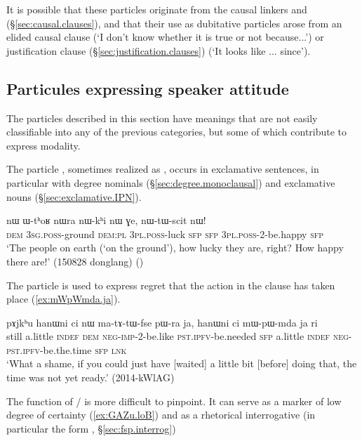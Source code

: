 It is possible that these particles originate from the causal linkers  and  (§\ref{sec:causal.clauses}), and that their use as dubitative particles arose from an elided causal clause (`I don't know whether it is true or not because...') or justification clause (§\ref{sec:justification.clauses}) (`It looks like ... since').

\subsection{Particules expressing speaker attitude} \label{sec:fsp.attitude}
The particles described in this section have meanings that are not easily classifiable into any of the previous categories, but some of which contribute to express modality.
 
The particle , sometimes realized as , occurs in exclamative sentences, in particular with degree nominals (§\ref{sec:degree.monoclausal}) and exclamative nouns (§\ref{sec:exclamative.IPN}).

\begin{exe} 
\ex \label{ex:nWtWscit.nW}
\gll  nɯ ɯ-tʰoʁ nɯra nɯ-kʰi nɯ ɣe, nɯ-tɯ-scit nɯ! \\
\textsc{dem} \textsc{3sg}.\textsc{poss}-ground \textsc{dem}:\textsc{pl} \textsc{3pl}.\textsc{poss}-luck \textsc{sfp} \textsc{sfp}  \textsc{3pl}.\textsc{poss}-2-be.happy \textsc{sfp} \\
\glt `The people on earth (`on the ground'), how lucky they are, right? How happy there are!' (150828 donglang) ()
\end{exe} 

The particle  is used to express regret that the action in the clause has taken place (\ref{ex:mWpWmda.ja}).

\begin{exe} 
\ex \label{ex:mWpWmda.ja}
\gll   pɤjkʰu hanɯni ci nɯ ma-tɤ-tɯ-fse pɯ-ra ja, hanɯni ci mɯ-pɯ-mda ja ri \\
still a.little \textsc{indef} \textsc{dem} \textsc{neg}-\textsc{imp}-2-be.like \textsc{pst}.\textsc{ipfv}-be.needed \textsc{sfp} 
 a.little \textsc{indef}   \textsc{neg}-\textsc{pst}.\textsc{ipfv}-be.the.time \textsc{sfp}  \textsc{lnk} \\
\glt `What a shame, if you could just have [waited] a little bit [before] doing that, the time was not yet ready.' (2014-kWlAG)
\end{exe} 

The function of  /  is more difficult to pinpoint. It can serve as a marker of low degree of certainty (\ref{ex:GAZu.loB}) and as a rhetorical interrogative (in particular the form , §\ref{sec:fsp.interrog})



